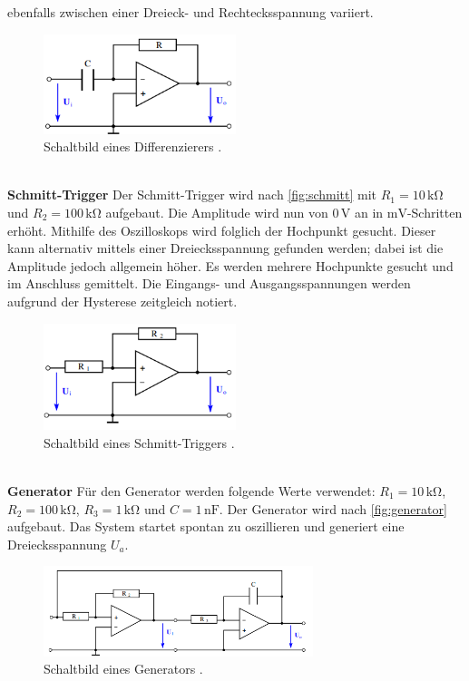 ebenfalls zwischen einer Dreieck- und Rechtecksspannung variiert.
\begin{figure}
    \centering
    \includegraphics[width=0.5\textwidth]{differenzierer.png}
    \caption{Schaltbild eines Differenzierers \cite{ap51}.}
    \label{fig:differenzierer}
\end{figure}
\\
\textbf{Schmitt-Trigger}
Der Schmitt-Trigger wird nach \autoref{fig:schmitt} mit $R_1 = 10\,\unit{\kilo\ohm}$ und
$R_2=100\,\unit{\kilo\ohm}$ aufgebaut. Die Amplitude wird nun von $0\,\unit{\volt}$ an in $\unit{\milli\volt}$-Schritten 
erhöht. Mithilfe des Oszilloskops wird folglich der Hochpunkt gesucht. Dieser kann alternativ mittels einer 
Dreiecksspannung gefunden werden; dabei ist die Amplitude jedoch allgemein höher. Es werden mehrere Hochpunkte gesucht und im Anschluss gemittelt. 
Die Eingangs- und Ausgangsspannungen werden aufgrund der Hysterese zeitgleich notiert. 
\begin{figure}
    \centering
    \includegraphics[width=0.5\textwidth]{schmitt.png}
    \caption{Schaltbild eines Schmitt-Triggers \cite{ap51}.}
    \label{fig:schmitt}
\end{figure}
\\
\textbf{Generator}
Für den Generator werden folgende Werte verwendet: $R_1= 10\,\unit{\kilo\ohm}$, $R_2=100\,\unit{\kilo\ohm}$,
$R_3=1\,\unit{\kilo\ohm}$ und $C=1\,\text{nF}$. Der Generator wird nach \autoref{fig:generator} aufgebaut. 
Das System startet spontan zu oszillieren und generiert eine Dreiecksspannung $U_a$.
\begin{figure}
    \centering
    \includegraphics[width=0.7\textwidth]{generator.png}
    \caption{Schaltbild eines Generators \cite{ap51}.}
    \label{fig:generator}
\end{figure}
